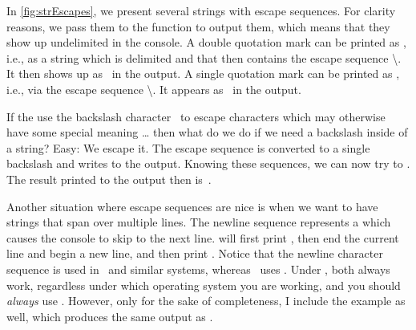 In \cref{fig:strEscapes}, we present several strings with escape sequences.
For clarity reasons, we pass them to the  function to output them, which means that they show up undelimited in the console.
A double quotation mark can be printed as , i.e., as a string which is delimited and that then contains the escape sequence {\textbackslash\textquotedbl}\pythonIdx{\textbackslash\textquotedbl}.
It then shows up as~ in the output.
A single quotation mark can be printed as , i.e., via the escape sequence {\textbackslash\textquotesingle}\pythonIdx{\textbackslash\textquotesingle}.
It appears as~ in the output.

If the use the backslash character~\inQuotes{\textbackslash}\pythonIdx{\textbackslash} to escape characters which may otherwise have some special meaning {\dots} then what do we do if we need a backslash inside of a string?
Easy: We escape it.
The escape sequence \inQuotes{\textbackslash\textbackslash}\pythonIdx{\textbackslash\textbackslash} is converted to a single backslash and \expandafter{} writes \textil{\\} to the output.
Knowing these sequences, we can now try to .
The result printed to the output then is~.

Another situation where escape sequences are nice is when we want to have strings that span over multiple lines.
The newline sequence  represents a  which causes the console to skip to the next line.
 will first print , then end the current line and begin a new line, and then print .
Notice that the newline character sequence  is used in \linux\ and similar systems, whereas \windows\ uses .
Under \python, both always work, regardless under which operating system you are working, and you should \emph{always} use .
However, only for the sake of completeness, I include the example  as well, which produces the same output as .

